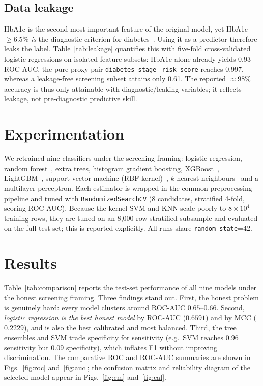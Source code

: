 \documentclass[conference]{IEEEtran}
\begin{document}
\subsection{Data leakage}
HbA1c is the second most important feature of the original model, yet
HbA1c $\geq 6.5\%$ \emph{is} the diagnostic criterion for
diabetes~\cite{ada2021classification}. Using it as a predictor therefore leaks
the label. Table~\ref{tab:leakage} quantifies this with five-fold
cross-validated logistic regressions on isolated feature subsets: HbA1c alone
already yields 0.93 ROC-AUC, the pure-proxy pair
\texttt{diabetes\_stage}+\texttt{risk\_score} reaches 0.997, whereas a
leakage-free screening subset attains only 0.61. The reported $\approx$98\%
accuracy is thus only attainable with diagnostic/leaking variables; it reflects
leakage, not pre-diagnostic predictive skill.



\section{Experimentation}
We retrained nine classifiers under the screening framing:
logistic regression, random forest~\cite{breiman2001random}, extra trees,
histogram gradient boosting, XGBoost~\cite{chen2016xgboost},
LightGBM~\cite{ke2017lightgbm}, support-vector machine (RBF
kernel)~\cite{cortes1995svm}, $k$-nearest neighbours~\cite{cover1967knn} and a
multilayer perceptron. Each estimator is wrapped in the common preprocessing
pipeline and tuned with \texttt{RandomizedSearchCV} (8 candidates,
stratified 4-fold, scoring ROC-AUC). Because the kernel SVM and KNN scale poorly
to $8\times10^4$ training rows, they are tuned on an 8{,}000-row stratified
subsample and evaluated on the full test set; this is reported explicitly. All
runs share \texttt{random\_state}=42.

\section{Results}
Table~\ref{tab:comparison} reports the test-set performance of all nine models
under the honest screening framing. Three findings stand out. First, the honest
problem is genuinely hard: every model clusters around ROC-AUC $0.65$--$0.66$.
Second, \emph{logistic regression is the best honest model} by ROC-AUC
($0.6591$) and by MCC ($0.2229$), and is also the best calibrated and most
balanced. Third, the tree ensembles and SVM trade specificity for sensitivity
(e.g.\ SVM reaches $0.96$ sensitivity but $0.09$ specificity), which inflates F1
without improving discrimination. The comparative ROC and ROC-AUC summaries are
shown in Figs.~\ref{fig:roc} and~\ref{fig:auc}; the confusion matrix and
reliability diagram of the selected model appear in Figs.~\ref{fig:cm}
and~\ref{fig:cal}.
\end{document}
